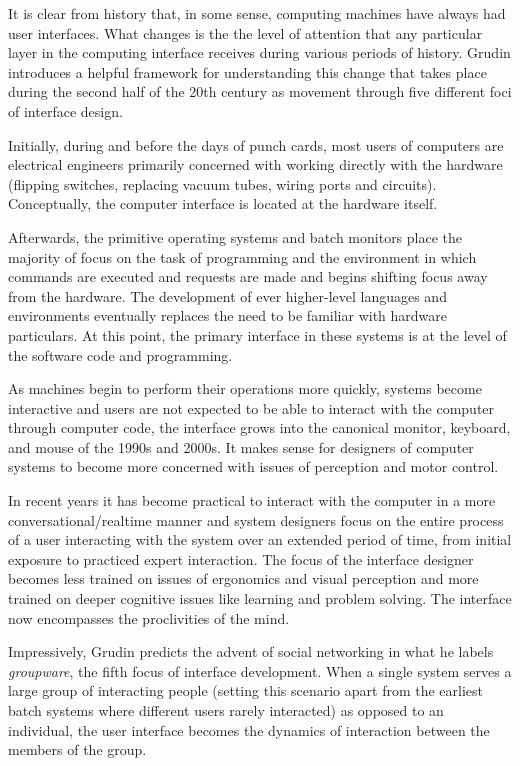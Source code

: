 It is clear from history that, in some sense, computing machines have always had user interfaces. What changes is the the level of attention that any particular layer in the computing interface receives during various periods of history. Grudin \cite{continuity1990} introduces a helpful framework for understanding this change that takes place during the second half of the 20th century as movement through five different foci of interface design. 

Initially, during and before the days of punch cards, most users of computers are electrical engineers primarily concerned with working directly with the hardware (flipping switches, replacing vacuum tubes, wiring ports and circuits). Conceptually, the computer interface is located at the hardware itself. 

Afterwards, the primitive operating systems and batch monitors place the majority of focus on the task of programming and the environment in which commands are executed and requests are made and begins shifting focus away from the hardware. The development of ever higher-level languages and environments eventually replaces the need to be familiar with hardware particulars. At this point, the primary interface in these systems is at the level of the software code and programming. 

As machines begin to perform their operations more quickly, systems become interactive and users are not expected to be able to interact with the computer through computer code, the interface grows into the canonical monitor, keyboard, and mouse of the 1990s and 2000s. It makes sense for designers of computer systems to become more concerned with issues of perception and motor control. 

In recent years it has become practical to interact with the computer in a more conversational/realtime manner and system designers focus on the entire process of a user interacting with the system over an extended period of time, from initial exposure to practiced expert interaction. The focus of the interface designer becomes less trained on issues of ergonomics and visual perception and more trained on deeper cognitive issues like learning and problem solving. The interface now encompasses the proclivities of the mind. 

Impressively, Grudin predicts the advent of social networking in what he labels \emph{groupware}, the fifth focus of interface development. When a single system serves a large group of interacting people (setting this scenario apart from the earliest batch systems where different users rarely interacted) as opposed to an individual, the user interface becomes the dynamics of interaction between the members of the group.

